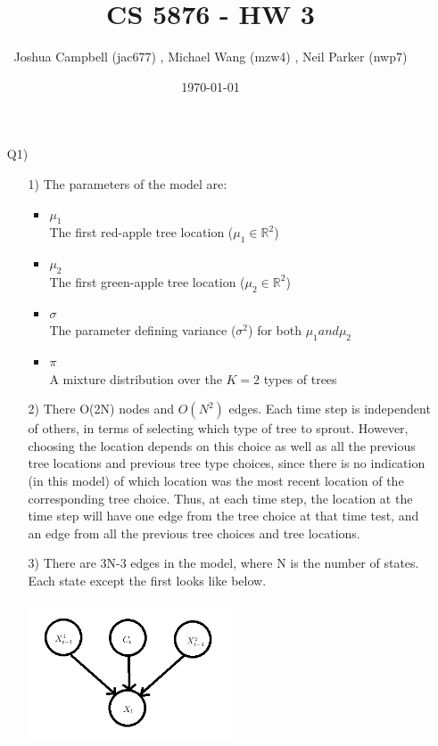 \documentclass[12pt]{article}
\title{CS 5876 - HW 3}
\author{Joshua Campbell (jac677) , Michael Wang (mzw4) , Neil Parker (nwp7) }
\date{\today}
\begin{document}
\maketitle

\begin{enumerate}

\item[Q1)]
	
	\begin{enumerate}
	\item[1)] The parameters of the model are:
		\begin{itemize}
		\item $\mu_1$\\
		The first red-apple tree location ($ \mu_1 \in \mathbb{R}^2 $)
		\item $\mu_2$\\
		The first green-apple tree location ($ \mu_2 \in \mathbb{R}^2 $)
		\item $\sigma$\\
		The parameter defining variance ($ \sigma^2 $) for both $ \mu_1 and \mu_2 $
		\item $\pi$\\
		A mixture distribution over the $ K=2 $ types of trees
		\end{itemize}
	
	\item[2)] There O(2N) nodes and $O(N^2)$ edges. Each time step is independent of others, in terms of selecting which type of tree to sprout. However, choosing the location depends on this choice as well as all the previous tree locations and previous tree type choices, since there is no indication (in this model) of which location was the most recent location of the corresponding tree choice. Thus, at each time step, the location at the time step will have one edge from the tree choice at that time test, and an edge from all the previous tree choices and tree locations.
	
	\item[3)] There are 3N-3 edges in the model, where N is the number of states. Each state except the first looks like below.
		
	\includegraphics[width=0.5\textwidth]{Q1-3-1.png}
	

\end{enumerate}
\end{enumerate}
\end{document}
